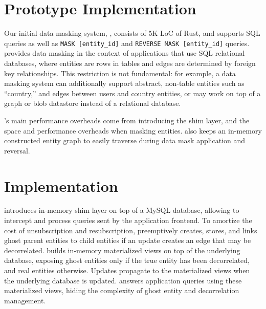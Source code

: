 \section{Prototype Implementation}
\label{sec:proto}
Our initial data masking system, \sys, consists of 5K LoC of Rust, and supports SQL queries as well
as \texttt{MASK [entity\_id]} and \texttt{REVERSE MASK [entity\_id]} queries.
\sys provides data masking in the context of applications that use SQL relational databases, where
entities are rows in tables and edges are determined by foreign key relationships. 
%
This restriction is not fundamental: for example, a data masking system can
additionally support abstract, non-table entities such as ``country,'' and edges between users and
country entities, or may work on top of a graph or blob datastore instead of a relational database.

\sys's main performance overheads come from introducing the shim layer, and the space and
performance overheads when masking entities. \sys also keeps an in-memory constructed entity graph
to easily traverse during data mask application and reversal.

%
\iffalse
\section{Implementation}

\name introduces in-memory shim layer on top of a MySQL database, 
allowing \name to intercept and process queries sent by the application frontend. 
To amortize the cost of unsubscription and resubscription, \name preemptively creates, stores, and
links ghost parent entities to child entities if an update creates an edge that may be decorrelated.
\name builds in-memory materialized views on top of the underlying database, exposing ghost
entities only if the true entity has been decorrelated, and real entities otherwise. Updates
propagate to the materialized views when the underlying database is updated. \name answers
application queries using these materialized views, hiding the complexity of ghost entity and
decorrelation management.

